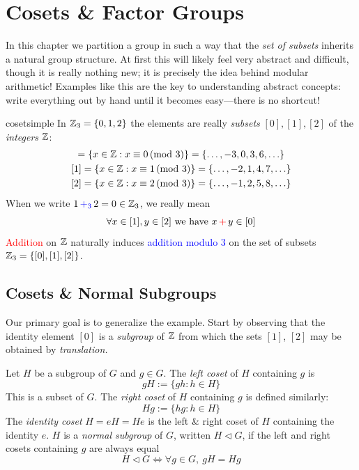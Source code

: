 \graphicspath{{6coset/asy/}}

\section{Cosets \& Factor Groups}\label{chap:coset}

In this chapter we partition a group in such a way that the \emph{set of subsets} inherits a natural group structure. At first this will likely feel very abstract and difficult, though it is really nothing new; it is precisely the idea behind modular arithmetic! Examples like this are the key to understanding abstract concepts: write everything out by hand until it becomes easy---there is no shortcut!

\begin{example}{}{cosetsimple}
	In $\mathbb{Z}_3=\{0,1,2\}$ the elements are really \emph{subsets} $[0],[1],[2]$ of the \emph{integers} $\mathbb{Z}$:
	\begin{gather*}
		[0]=\{x\in\Z:x \equiv 0\negthickspace\pmod 3\} =\{\ldots,-3,0,3,6,\ldots\}\\
		[1]=\{x\in\Z:x \equiv 1\negthickspace\pmod 3\} =\{\ldots,-2,1,4,7,\ldots\}\\
		[2]=\{x\in\Z:x \equiv 2\negthickspace\pmod 3\} =\{\ldots,-1,2,5,8,\ldots\}
	\end{gather*}
	When we write $1\operatorname{\textcolor{blue}{+_3}}2=0\in\mathbb{Z}_3$, we really mean
	\[
		\forall x\in[1], y\in[2]
		\text{ we have }
		x\operatorname{\textcolor{red}{+}}y\in [0]
	\]
	\textcolor{red}{Addition} on $\mathbb{Z}$ naturally induces \textcolor{blue}{addition modulo 3} on the set of subsets $\mathbb{Z}_3=\{[0],[1],[2]\}$.
\end{example}


\subsection{Cosets \& Normal Subgroups}\label{sec:cosetnormal}

Our primary goal is to generalize the example. Start by observing that the identity element $[0]$ is a \emph{subgroup} of $\mathbb{Z}$ from which the sets $[1]$, $[2]$ may be obtained by \emph{translation.}

\begin{defn}{}{}
	Let $H$ be a subgroup of $G$ and $g\in G$. The \emph{left coset} of $H$ containing $g$ is 
	\[
		gH:=\{gh:h\in H\}\tag{$x\in gH\iff \exists h\in H$ such that $x=gh$}
	\]
	This is a subset of $G$. The \emph{right coset} of $H$ containing $g$ is defined similarly:
	\[
		Hg:=\{hg:h\in H\}
	\]
	The \emph{identity coset} $H=eH=He$ is the left \& right coset of $H$ containing the identity $e$.\smallbreak
	$H$ is a \emph{normal subgroup} of $G$, written $H\triangleleft G$, if the left and right cosets containing $g$ are always equal
	\[
		H\triangleleft G
		\iff
		\forall g\in G,\ gH=Hg
	\]
\end{defn}

